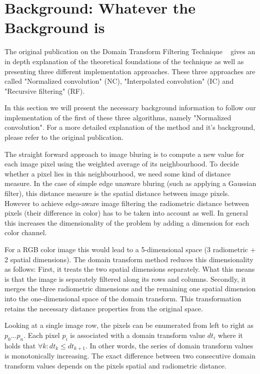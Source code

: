 \section{Background: Whatever the Background is}\label{sec:background}

The original publication on the Domain Transform Filtering Technique ~\cite{GastalOliveira2011DomainTransform} gives  an in depth explanation of the theoretical foundations of the technique as well as presenting three different implementation approaches. These three approaches are called "Normalized convolution" (NC), "Interpolated convolution" (IC) and "Recursive filtering" (RF). 

In this section we will present the necessary background information to follow our implementation of the first of these three algorithms, namely "Normalized convolution". For a more detailed explanation of the method and it's background, please refer to the original publication.

The straight forward approach to image bluring is to compute a new value for each image pixel using the weighted average of its neighbourhood. To decide whether a pixel lies in this neighbourhood, we need some kind of distance measure. In the case of simple edge unaware bluring (such as applying a Gaussian filter), this distance measure is the spatial distance between image pixels. However to achieve edge-aware image filtering the radiometric distance between pixels (their difference in color) has to be taken into account as well.
In general this increases the dimensionality of the problem by adding a dimension for each color channel.

For a RGB color image this would lead to a 5-dimensional space (3 radiometric + 2 spatial dimensions). The domain transform method reduces this dimensionality as follows:
First, it treats the two spatial dimensions separately. What this means is that the image is separately filtered along its rows and columns. Secondly, it merges the three radiometric dimensions and the remaining one spatial dimension into the one-dimensional space of the domain transform. This transformation retains the necessary distance properties from the original space.

Looking at a single image row, the pixels can be enumerated from left to right as $ p_0 \dots p_n$. Each pixel $p_i$ is associated with a domain transform value $dt_i$ where it holds that $\forall k : dt_k \leq dt_{k+1}$. In other words, the series of domain transform values is monotonically increasing. The exact difference between two consecutive domain transform values depends on the pixels spatial and radiometric distance.



